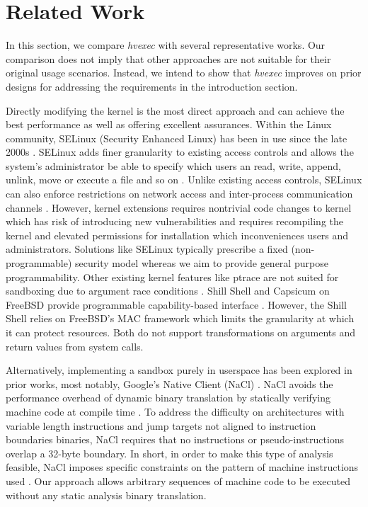 \documentclass{article}
\newcommand{\PROJNAME}{\textit{hvexec}}
\begin{document}
\section{Related Work}
In this section, we compare \PROJNAME{} with several representative works.
Our comparison does not imply that other approaches are not suitable for their original usage scenarios.
Instead, we intend to show that \PROJNAME{} improves on prior designs for addressing the requirements in the introduction section.

Directly modifying the kernel is the most direct approach and can achieve the best performance as well as offering excellent assurances.
Within the Linux community, SELinux (Security Enhanced Linux) has been in use since the late 2000s \cite{SELinux2006}.
SELinux adds finer granularity to existing access controls and allows the system's administrator be able to specify which users an read, write, append, unlink, move or execute a file and so on \cite{SELinux2006}.
Unlike existing access controls, SELinux can also enforce restrictions on network access and inter-process communication channels \cite{SELinux2006}. However, kernel extensions requires nontrivial code changes to kernel which has risk of introducing new vulnerabilities \cite{ptrace2002, ptrace2003} and requires recompiling the kernel and elevated permissions for installation which inconveniences users and administrators.
Solutions like SELinux typically prescribe a fixed (non-programmable) security model whereas we aim to provide general purpose programmability.
Other existing kernel features like ptrace are not suited for sandboxing due to argument race conditions \cite{ptrace2003}.
Shill Shell and Capsicum on FreeBSD provide programmable capability-based interface \cite{capsicum2010, shillshell2014}. However, the Shill Shell relies on FreeBSD's MAC framework which limits the granularity at which it can protect resources. Both do not support transformations on arguments and return values from system calls.

Alternatively, implementing a sandbox purely in userspace has been explored in prior works, most notably, Google's Native Client (NaCl) \cite{nacl2009, nacl2011}.
NaCl avoids the performance overhead of dynamic binary translation by statically verifying machine code at compile time \cite{nacl2009}.
To address the difficulty on architectures with variable length instructions and jump targets not aligned to instruction boundaries binaries, NaCl requires that no instructions or pseudo-instructions overlap a 32-byte boundary.
In short, in order to make this type of analysis feasible, NaCl imposes specific constraints on the pattern of machine instructions used \cite{nacl2009}.
Our approach allows arbitrary sequences of machine code to be executed without any static analysis binary translation.
\end{document}
